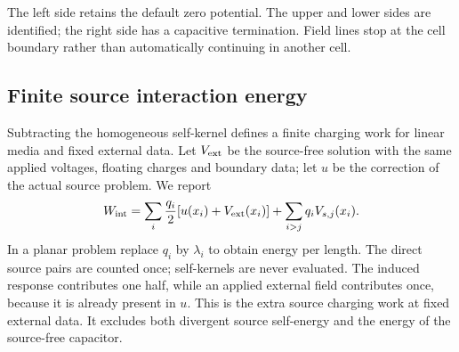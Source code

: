 \Needspace{14cm}
\begin{codeexample}[width=0pt]
\end{codeexample}
The left side retains the default zero potential. The upper and lower sides
are identified; the right side has a capacitive termination. Field lines stop
at the cell boundary rather than automatically continuing in another cell.

\subsection{Finite source interaction energy}
\label{sec:electric-source-energy}
Subtracting the homogeneous self-kernel defines a finite charging work for
linear media and fixed external data. Let $V_{\rm ext}$ be the source-free
solution with the same applied voltages, floating charges and boundary data;
let $u$ be the correction of the actual source problem. We report
\[
 W_{\rm int}=\sum_i\frac{q_i}{2}
       [u(x_i)+V_{\rm ext}(x_i)]
       +\sum_{i>j}q_i V_{s,j}(x_i).
\]
In a planar problem replace $q_i$ by $\lambda_i$ to obtain energy per length.
The direct source pairs are counted once; self-kernels are never evaluated.
The induced response contributes one half, while an applied external field
contributes once, because it is already present in $u$. This is the extra
source charging work at fixed external data. It excludes both divergent
source self-energy and the energy of the source-free capacitor.

